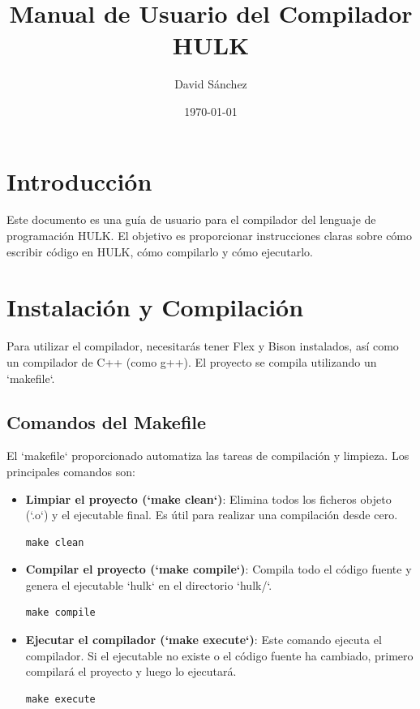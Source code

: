 \documentclass{article}
\title{Manual de Usuario del Compilador HULK}
\author{David S\'anchez}
\date{\today}
\begin{document}
\maketitle

\tableofcontents

\newpage

\section{Introducción}

Este documento es una guía de usuario para el compilador del lenguaje de programación HULK. El objetivo es proporcionar instrucciones claras sobre cómo escribir código en HULK, cómo compilarlo y cómo ejecutarlo.

\section{Instalación y Compilación}

Para utilizar el compilador, necesitarás tener Flex y Bison instalados, así como un compilador de C++ (como g++). El proyecto se compila utilizando un `makefile`.

\subsection{Comandos del Makefile}

El `makefile` proporcionado automatiza las tareas de compilación y limpieza. Los principales comandos son:

\begin{itemize}
    \item \textbf{Limpiar el proyecto (`make clean`)}: Elimina todos los ficheros objeto (`.o`) y el ejecutable final. Es útil para realizar una compilación desde cero.
    \begin{verbatim}
make clean
    \end{verbatim}

    \item \textbf{Compilar el proyecto (`make compile`)}: Compila todo el código fuente y genera el ejecutable `hulk` en el directorio `hulk/`.
    \begin{verbatim}
make compile
    \end{verbatim}

    \item \textbf{Ejecutar el compilador (`make execute`)}: Este comando ejecuta el compilador. Si el ejecutable no existe o el código fuente ha cambiado, primero compilará el proyecto y luego lo ejecutará.
    \begin{verbatim}
make execute
    \end{verbatim}
\end{itemize}
\end{document}
